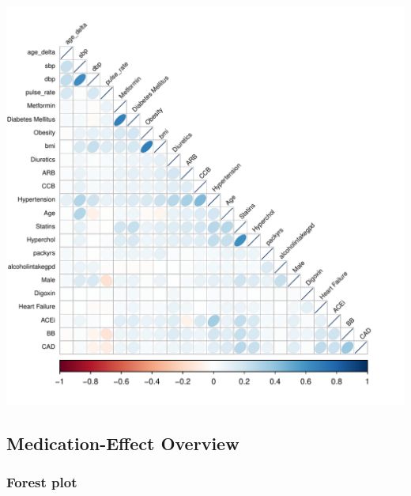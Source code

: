 \documentclass[
]{article}
\begin{document}
\includegraphics{../results/report_files/figure-latex/feature-corr-plot-hclust-1.pdf}

\hypertarget{medication-effect-overview}{%
\subsection{Medication-Effect
Overview}\label{medication-effect-overview}}

\hypertarget{forest-plot}{%
\subsubsection{Forest plot}\label{forest-plot}}
\end{document}
